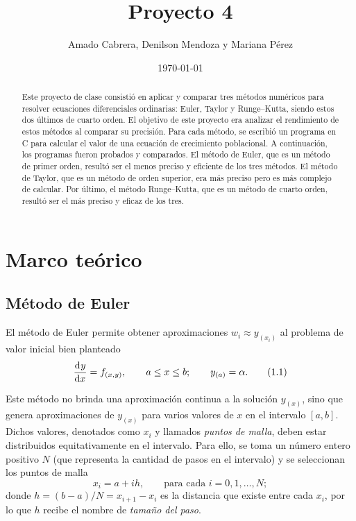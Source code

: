\documentclass[
    english, spanish, Ce-table, Ce-theorem
]{CabesHW}
\institute{Escuela de Ciencias Físicas y Matemática}
\title{Proyecto 4}
\author{Amado Cabrera, Denilson Mendoza y Mariana Pérez}
\date{\today}
\begin{document}
\maketitle

\begin{abstract}
Este proyecto de clase consistió en aplicar y comparar tres métodos numéricos para resolver ecuaciones diferenciales ordinarias: Euler, Taylor y Runge--Kutta, siendo estos dos últimos de cuarto orden. El objetivo de este proyecto era analizar el rendimiento de estos métodos al comparar su precisión. Para cada método, se escribió un programa en C para calcular el valor de una ecuación de crecimiento poblacional. A continuación, los programas fueron probados y comparados. El método de Euler, que es un método de primer orden, resultó ser el menos preciso y eficiente de los tres métodos. El método de Taylor, que es un método de orden superior, era más preciso pero es más complejo de calcular. Por último, el método Runge--Kutta, que es un método de cuarto orden, resultó ser el más preciso y eficaz de los tres.
\end{abstract}

\vspace{0.5em}
\section{Marco teórico}
\subsection{Método de Euler}
El método de Euler permite obtener aproximaciones $w_i \approx y_{(x_i)}$ al problema de valor inicial bien planteado
\begin{align*}
\label{1.1}
    \td{y}{x} = f_{(x,y)}, \qquad a \leq x \leq b; \qquad y_{(a)} = \alpha. \tag{1.1}
\end{align*}

Este método no brinda una aproximación continua a la solución $y_{(x)}$, sino que genera aproximaciones de $y_{(x)}$ para varios valores de $x$ en el intervalo $[a, b]$. Dichos valores, denotados como $x_i$ y llamados \textit{puntos de malla}, deben estar distribuidos equitativamente en el intervalo. Para ello, se toma un número entero positivo $N$ (que representa la cantidad de pasos en el intervalo) y se seleccionan los puntos de malla
\[ x_i = a + ih, \qquad \text{para cada $i = 0, 1, \ldots, N$}; \]
donde $h = (b-a)/N = x_{i+1} - x_i$ es la distancia que existe entre cada $x_i$, por lo que $h$ recibe el nombre de \textit{tamaño del paso}.
\end{document}
